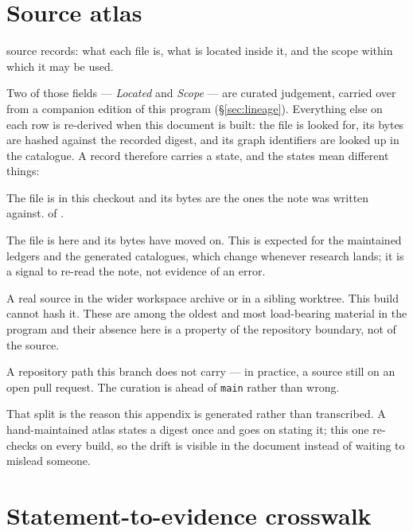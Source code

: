 \section{Source atlas}
\label{app:atlas}

\AtlasRecords{} source records: what each file is, what is located inside
it, and the scope within which it may be used.

Two of those fields --- \textit{Located} and \textit{Scope} --- are
curated judgement, carried over from a companion edition of this
program (\S\ref{sec:lineage}). Everything else on each row is
re-derived when this document is built: the file is looked for, its
bytes are hashed against the recorded digest, and its graph identifiers
are looked up in the catalogue. A record therefore carries a state, and
the states mean different things:

\begin{description}[leftmargin=1.2em,style=nextline]
\item[verified] The file is in this checkout and its bytes are the ones
  the note was written against. \AtlasVerified{} of \AtlasRecords{}.
\item[changed since curated] The file is here and its bytes have moved
  on. This is expected for the maintained ledgers and the generated
  catalogues, which change whenever research lands; it is a signal to
  re-read the note, not evidence of an error.
\item[outside this checkout] A real source in the wider workspace
  archive or in a sibling worktree. This build cannot hash it. These
  are among the oldest and most load-bearing material in the program
  and their absence here is a property of the repository boundary, not
  of the source.
\item[not on this branch] A repository path this branch does not carry
  --- in practice, a source still on an open pull request. The curation
  is ahead of \texttt{main} rather than wrong.
\end{description}

That split is the reason this appendix is generated rather than
transcribed. A hand-maintained atlas states a digest once and goes on
stating it; this one re-checks on every build, so the drift is visible
in the document instead of waiting to mislead someone.



\section{Statement-to-evidence crosswalk}
\label{app:crosswalk}

